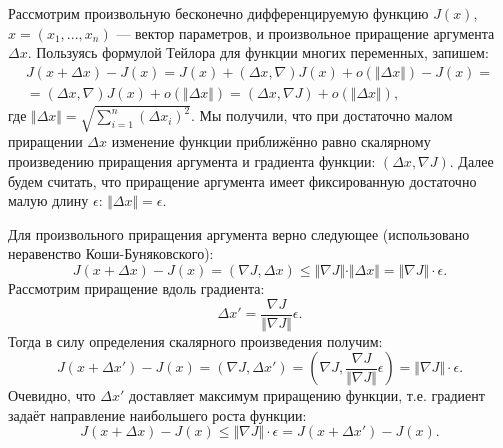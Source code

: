 \documentclass[14pt]{extarticle}
\begin{document}
Рассмотрим произвольную бесконечно дифференцируемую функцию $ J(x) $, $ x = (x_1, ..., x_n) $ --- вектор параметров, и произвольное приращение аргумента $ \Delta x $. Пользуясь формулой Тейлора для функции многих переменных, запишем:
\begin{align*}
J \left( x + \Delta x \right) - J \left( x \right)
= J \left( x \right) + \left( \Delta x, \nabla \right) J \left( x \right) + o \left( \Vert \Delta x \Vert \right) - J \left( x \right) = \\
= \left( \Delta x, \nabla \right) J \left( x \right) + o \left( \Vert \Delta x \Vert \right)
= \left( \Delta x, \nabla J \right) + o \left( \Vert \Delta x \Vert \right),
\end{align*}
где $ \Vert \Delta x \Vert = \sqrt{\sum \limits_{i=1}^n \left( \Delta x_i \right)^2} $.
Мы получили, что при достаточно малом приращении $ \Delta x $ изменение функции приближённо равно скалярному произведению приращения аргумента и градиента функции: $ \left( \Delta x, \nabla J \right) $. Далее будем считать, что приращение аргумента имеет фиксированную достаточно малую длину $ \epsilon $: $\Vert \Delta x \Vert = \epsilon $.

Для произвольного приращения аргумента верно следующее (использовано неравенство Коши-Буняковского):
\begin{equation*}
J(x + \Delta x) - J(x) 
= (\nabla J, \Delta x) 
\le \Vert \nabla J \Vert \cdot \Vert \Delta x \Vert
= \Vert \nabla J \Vert \cdot \epsilon. 
\end{equation*}
Рассмотрим приращение вдоль градиента: 
$$ \Delta x' = \frac{\nabla J}{\Vert \nabla J \Vert} \epsilon. $$
Тогда в силу определения скалярного произведения получим:
\begin{equation*}
J(x + \Delta x') - J(x) 
= \left( \nabla J, \Delta x' \right)
= \left( \nabla J, \frac{\nabla J}{\Vert \nabla J \Vert} \epsilon \right) 
= \Vert \nabla J \Vert \cdot \epsilon.
\end{equation*}
Очевидно, что $ \Delta x' $ доставляет максимум приращению функции, т.е. градиент задаёт направление наибольшего роста функции:
\begin{equation*}
J(x + \Delta x) - J(x) \le \Vert \nabla J \Vert \cdot \epsilon 
= J(x + \Delta x') - J(x).
\end{equation*}
\end{document}
